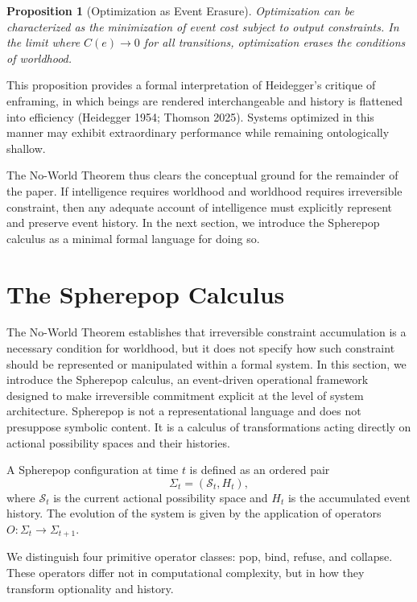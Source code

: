 \documentclass[11pt]{article}
\newtheorem{proposition}{Proposition}
\theoremstyle{remark}
\begin{document}
\begin{proposition}[Optimization as Event Erasure]
Optimization can be characterized as the minimization of event cost subject to output constraints. In the limit where $C(e) \to 0$ for all transitions, optimization erases the conditions of worldhood.
\end{proposition}

This proposition provides a formal interpretation of Heidegger’s critique of enframing, in which beings are rendered interchangeable and history is flattened into efficiency (Heidegger 1954; Thomson 2025). Systems optimized in this manner may exhibit extraordinary performance while remaining ontologically shallow.

The No-World Theorem thus clears the conceptual ground for the remainder of the paper. If intelligence requires worldhood and worldhood requires irreversible constraint, then any adequate account of intelligence must explicitly represent and preserve event history. In the next section, we introduce the Spherepop calculus as a minimal formal language for doing so.

\section{The Spherepop Calculus}

The No-World Theorem establishes that irreversible constraint accumulation is a necessary condition for worldhood, but it does not specify how such constraint should be represented or manipulated within a formal system. In this section, we introduce the Spherepop calculus, an event-driven operational framework designed to make irreversible commitment explicit at the level of system architecture. Spherepop is not a representational language and does not presuppose symbolic content. It is a calculus of transformations acting directly on actional possibility spaces and their histories.

A Spherepop configuration at time $t$ is defined as an ordered pair
\[
\Sigma_t = (\mathcal{S}_t, H_t),
\]
where $\mathcal{S}_t$ is the current actional possibility space and $H_t$ is the accumulated event history. The evolution of the system is given by the application of operators $O : \Sigma_t \rightarrow \Sigma_{t+1}$.

We distinguish four primitive operator classes: pop, bind, refuse, and collapse. These operators differ not in computational complexity, but in how they transform optionality and history.
\end{document}
